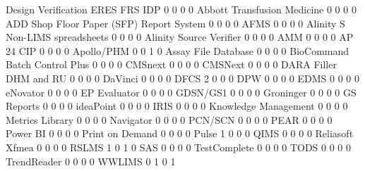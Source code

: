 \documentclass{article}
\begin{document}
\begin{Schunk}
\begin{Soutput}
                                           Design Verification ERES FRS IDP
                                                             0    0   0   0
  Abbott Transfusion Medicine                                0    0   0   0
  ADD Shop Floor Paper (SFP) Report System                   0    0   0   0
  AFMS                                                       0    0   0   0
  Alinity S Non-LIMS spreadsheets                            0    0   0   0
  Alinity Source Verifier                                    0    0   0   0
  AMM                                                        0    0   0   0
  AP 24 CIP                                                  0    0   0   0
  Apollo/PHM                                                 0    0   1   0
  Assay File Database                                        0    0   0   0
  BioCommand Batch Control Plus                              0    0   0   0
  CMSnext                                                    0    0   0   0
  CMSNext                                                    0    0   0   0
  DARA Filler DHM and RU                                     0    0   0   0
  DaVinci                                                    0    0   0   0
  DFCS                                                       2    0   0   0
  DPW                                                        0    0   0   0
  EDMS                                                       0    0   0   0
  eNovator                                                   0    0   0   0
  EP Evaluator                                               0    0   0   0
  GDSN/GS1                                                   0    0   0   0
  Groninger                                                  0    0   0   0
  GS Reports                                                 0    0   0   0
  ideaPoint                                                  0    0   0   0
  IRIS                                                       0    0   0   0
  Knowledge Management                                       0    0   0   0
  Metrics Library                                            0    0   0   0
  Navigator                                                  0    0   0   0
  PCN/SCN                                                    0    0   0   0
  PEAR                                                       0    0   0   0
  Power BI                                                   0    0   0   0
  Print on Demand                                            0    0   0   0
  Pulse                                                      1    0   0   0
  QIMS                                                       0    0   0   0
  Reliasoft Xfmea                                            0    0   0   0
  RSLMS                                                      1    0   1   0
  SAS                                                        0    0   0   0
  TestComplete                                               0    0   0   0
  TODS                                                       0    0   0   0
  TrendReader                                                0    0   0   0
  WWLIMS                                                     0    1   0   1
                                          

\end{Soutput}
\end{Schunk}
\end{document}
